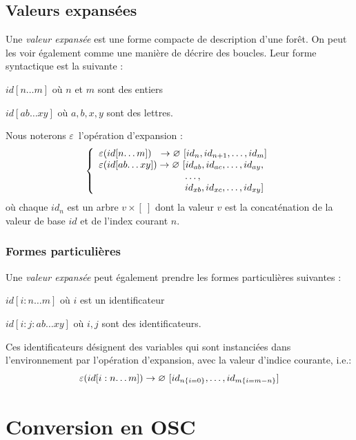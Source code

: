 \documentclass{article}
\newcommand{\forest}	{\ensuremath{\varnothing}}
\newcommand{\etc}		{\ensuremath{\text{…}}}
\newcommand{\emptyf}	{\ensuremath{[\ ]}}
\newcommand{\nexpand}	{\ensuremath{\varepsilon}}
\newcommand{\ulb}		{\hspace*{31.5mm}}
\begin{document}
\subsection{Valeurs expansées}

Une \emph{valeur expansée} est une forme compacte de description d'une forêt. On peut les voir également comme une manière de décrire des boucles. Leur forme syntactique est la suivante :
\begin{description}
\item $id[n…m]$ 	où $n$ et $m$ sont des entiers
\item $id[ab…xy]$ où $a,b,x,y$ sont des lettres.
\end{description}
Nous noterons \nexpand\ l'opération d'expansion :
\[
\left\{
\begin{array}{l}
	\nexpand(id[n\etc m])   \ \ \to \forest \ [id_n,id_{n+1},\etc ,id_m] \\
	\nexpand(id[ab\etc xy]) \to \forest \ [id_{ab},id_{ac},\etc ,id_{ay}, \\
	\ulb \etc ,\\
	\ulb id_{xb},id_{xc},\etc ,id_{xy}]
\end{array}
\right.
\]
où chaque $id_n$ est un arbre $v \times \emptyf$ dont la valeur $v$ est la concaténation de la valeur de base $id$ et de l'index courant $n$.

\subsubsection{Formes particulières}

Une \emph{valeur expansée} peut également prendre les formes particulières suivantes : 
\begin{description}
\item $id[i:n…m]$ 	où $i$ est un identificateur
\item $id[i:j:ab…xy]$ où $i,j$ sont des identificateurs.
\end{description}
Ces identificateurs désignent des variables qui sont instanciées dans l'environnement par l'opération d'expansion, avec la valeur d'indice courante, i.e.:
\[
	\nexpand(id[i:n\etc m]) \to \forest \ [id_{n\{i=0\}},\etc ,id_{m\{i=m-n\}}] \\
\]


\section{Conversion en OSC}\label{ssec:slash}
\end{document}
